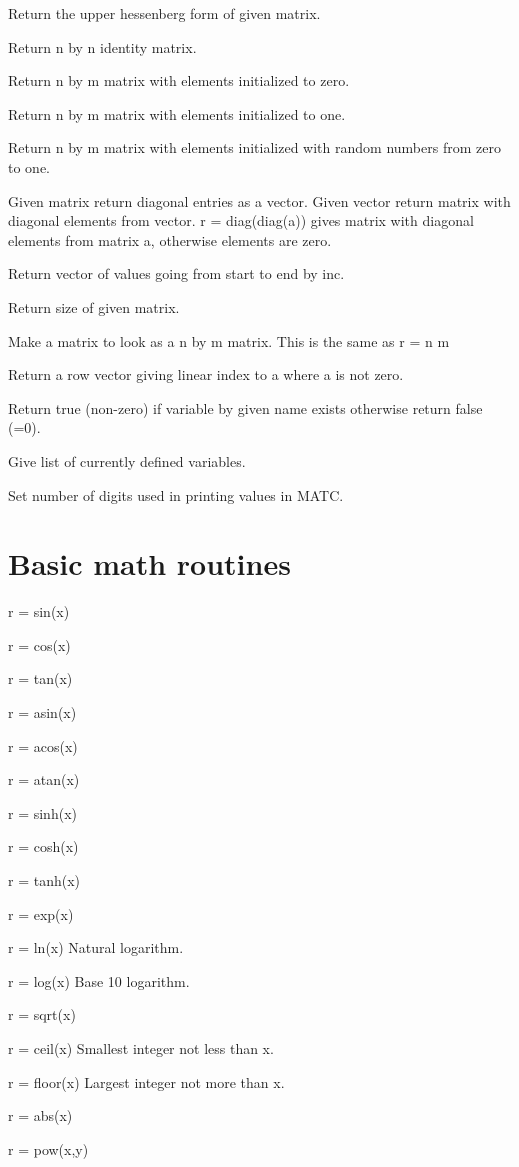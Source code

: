 Return the upper hessenberg form of given matrix. 

Return n by n identity matrix. 

Return n by m matrix with elements initialized to zero. 

Return n by m matrix with elements initialized to one. 

Return n by m matrix with elements initialized with random numbers from zero to one. 

Given matrix return diagonal entries as a vector. Given vector return matrix with diagonal elements from vector. r = diag(diag(a)) gives matrix with diagonal elements from matrix a, otherwise elements are zero. 

Return vector of values going from start to end by inc. 

Return size of given matrix. 

Make a matrix to look as a n by m matrix. This is the same as r = n m %

Return a row vector giving linear index to a where a is not zero. 

Return true (non-zero) if variable by given name exists otherwise return false (=0). 

Give list of currently defined variables. 

Set number of digits used in printing values in MATC. 
\sifend


\section{Basic math routines}

\ttbegin
r = sin(x)

r = cos(x)

r = tan(x)

r = asin(x)

r = acos(x)

r = atan(x)

r = sinh(x)

r = cosh(x)

r = tanh(x)

r = exp(x)

r = ln(x) Natural logarithm.

r = log(x) Base 10 logarithm.

r = sqrt(x)

r = ceil(x) Smallest integer not less than x.

r = floor(x) Largest integer not more than x.

r = abs(x)

r = pow(x,y) 
\ttend
